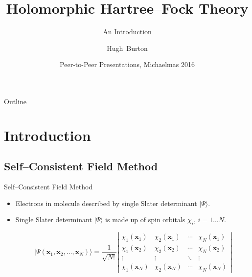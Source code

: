 \documentclass{beamer}
\title[Holomorphic Hartree--Fock Theory]
{%
  Holomorphic Hartree--Fock Theory
}
\subtitle{An Introduction}
\author[Burton, Thom]
{
  \hskip-1.7mm
  Hugh~Burton %
}
\institute[Burton and others]
{
  University of Cambridge
}
\date[P2P 2016]
{Peer-to-Peer Presentations, Michaelmas 2016}
\newcommand{\ket}[1] {{| #1 \rangle}}
\begin{document}
\begin{frame}
  \titlepage
\end{frame}

\begin{frame}{Outline}
  \tableofcontents
\end{frame}


\section{Introduction}

\subsection{Self--Consistent Field Method}

\begin{frame}{Self--Consistent Field Method}
 \begin{itemize}
  \item<1-> Electrons in molecule described by single Slater determinant $   \ket{\Psi}$.

  \item<2-> Single Slater determinant $\ket{\Psi}$ is made up of spin orbitals $\chi_i$, $i=1\dots N$.

  $$\ket{\Psi(\mathbf{x}_1, \mathbf{x}_2, \ldots, \mathbf{x}_N)} =
\frac{1}{\sqrt{N!}}
\left|
   \begin{matrix} \chi_1(\mathbf{x}_1) & \chi_2(\mathbf{x}_1) & \cdots & \chi_N(\mathbf{x}_1) \\
                      \chi_1(\mathbf{x}_2) & \chi_2(\mathbf{x}_2) & \cdots & \chi_N(\mathbf{x}_2) \\
                      \vdots & \vdots & \ddots & \vdots \\
                      \chi_1(\mathbf{x}_N) & \chi_2(\mathbf{x}_N) & \cdots & \chi_N(\mathbf{x}_N)
   \end{matrix} \right|$$
 \end{itemize}
\end{frame}
\end{document}

